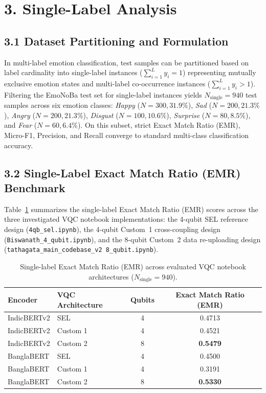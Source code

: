 \documentclass[11pt]{article}
\begin{document}
\section*{3. Single-Label Analysis}

\subsection*{3.1 Dataset Partitioning and Formulation}

In multi-label emotion classification, test samples can be partitioned based on label cardinality into single-label instances ($\sum_{i=1}^L y_i = 1$) representing mutually exclusive emotion states and multi-label co-occurrence instances ($\sum_{i=1}^L y_i > 1$). Filtering the EmoNoBa test set for single-label instances yields $N_{\text{single}} = 940$ test samples across six emotion classes: \emph{Happy} ($N=300, 31.9\%$), \emph{Sad} ($N=200, 21.3\%$), \emph{Angry} ($N=200, 21.3\%$), \emph{Disgust} ($N=100, 10.6\%$), \emph{Surprise} ($N=80, 8.5\%$), and \emph{Fear} ($N=60, 6.4\%$). On this subset, strict Exact Match Ratio (EMR), Micro-F1, Precision, and Recall converge to standard multi-class classification accuracy.

\subsection*{3.2 Single-Label Exact Match Ratio (EMR) Benchmark}

Table~\ref{tab:single_label_emr} summarizes the single-label Exact Match Ratio (EMR) scores across the three investigated VQC notebook implementations: the 4-qubit SEL reference design (\texttt{4qb\_sel.ipynb}), the 4-qubit Custom~1 cross-coupling design (\texttt{Biswanath\_4\_qubit.ipynb}), and the 8-qubit Custom~2 data re-uploading design (\texttt{tathagata\_main\_codebase\_v2 8\_qubit.ipynb}).

\begin{table}[h!]
\centering
\small
\begin{threeparttable}
\begin{tabular}{llcc}
\toprule
\textbf{Encoder} & \textbf{VQC Architecture} & \textbf{Qubits} & \textbf{Exact Match Ratio (EMR)} \\
\midrule
IndicBERTv2 & SEL      & 4 & 0.4713 \\
IndicBERTv2 & Custom 1 & 4 & 0.4521 \\
IndicBERTv2 & Custom 2 & 8 & \textbf{0.5479} \\
\addlinespace
BanglaBERT  & SEL      & 4 & 0.4500 \\
BanglaBERT  & Custom 1 & 4 & 0.3191 \\
BanglaBERT  & Custom 2 & 8 & \textbf{0.5330} \\
\bottomrule
\end{tabular}
\end{threeparttable}
\caption{Single-label Exact Match Ratio (EMR) across evaluated VQC notebook architectures ($N_{\text{single}} = 940$).}
\label{tab:single_label_emr}
\end{table}
\end{document}
